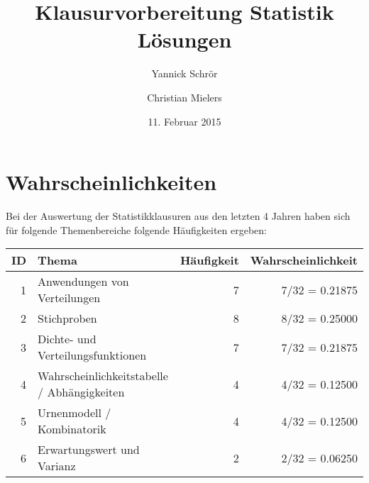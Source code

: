 \documentclass[11pt, a4paper]{article}
\title{Klausurvorbereitung Statistik \\ Lösungen}
\author{Yannick Schrör \and Christian Mielers}
\date{11. Februar 2015}
\begin{document}
\maketitle
\section{Wahrscheinlichkeiten}
Bei der Auswertung der Statistikklausuren aus den letzten 4 Jahren haben sich für folgende Themenbereiche folgende Häufigkeiten ergeben:\\

\begin{tabular}{r|l|r|r}
	ID 	&	Thema 										& Häufigkeit 	& Wahrscheinlichkeit\\ \hline
	1	& Anwendungen von Verteilungen 					& 7 			& 7/32 = 0.21875\\
	2	& Stichproben 									& 8				& 8/32 = 0.25000\\
	3	& Dichte- und Verteilungsfunktionen 			& 7 			& 7/32 = 0.21875\\
	4	& Wahrscheinlichkeitstabelle / Abhängigkeiten 	& 4 			& 4/32 = 0.12500\\
	5	& Urnenmodell / Kombinatorik 					& 4 			& 4/32 = 0.12500\\
	6	& Erwartungswert und Varianz 					& 2 			& 2/32 = 0.06250\\
\end{tabular}\\
\end{document}
